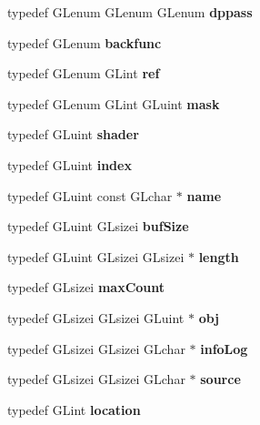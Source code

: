 \begin{DoxyCompactItemize}
\item 
typedef G\+Lenum G\+Lenum G\+Lenum {\bfseries dppass}\label{_s_d_l__opengl_8h_ac34ccc579f21686a5802750e270e8326}

\item 
typedef G\+Lenum {\bfseries backfunc}\label{_s_d_l__opengl_8h_a80bd5ace26a420c494f2b21d0421c5e2}

\item 
typedef G\+Lenum G\+Lint {\bfseries ref}\label{_s_d_l__opengl_8h_a083de4c8e32ad3d9059245f26be721de}

\item 
typedef G\+Lenum G\+Lint G\+Luint {\bfseries mask}\label{_s_d_l__opengl_8h_a5612bf87afe1aa200ad412866de45c1f}

\item 
typedef G\+Luint {\bfseries shader}\label{_s_d_l__opengl_8h_a57b2a96adb1d51204909a82d861e395e}

\item 
typedef G\+Luint {\bfseries index}\label{_s_d_l__opengl_8h_a57f14e05b1900f16a2da82ade47d0c6d}

\item 
typedef G\+Luint const G\+Lchar $\ast$ {\bfseries name}\label{_s_d_l__opengl_8h_af7477b8725fcf509c9623f64b9d09164}

\item 
typedef G\+Luint G\+Lsizei {\bfseries buf\+Size}\label{_s_d_l__opengl_8h_a09918d77dec487a91825343c8cfb2b2d}

\item 
typedef G\+Luint G\+Lsizei G\+Lsizei $\ast$ {\bfseries length}\label{_s_d_l__opengl_8h_a78c5c8710130a1a634d6a81d52be8db8}

\item 
typedef G\+Lsizei {\bfseries max\+Count}\label{_s_d_l__opengl_8h_a76b486a23d5da07752f89495cdaedcf4}

\item 
typedef G\+Lsizei G\+Lsizei G\+Luint $\ast$ {\bfseries obj}\label{_s_d_l__opengl_8h_a0c0d4701a6c89f4f7f0640715d27ab26}

\item 
typedef G\+Lsizei G\+Lsizei G\+Lchar $\ast$ {\bfseries info\+Log}\label{_s_d_l__opengl_8h_a66ecd5782c3b54799e8ac9edad536e74}

\item 
typedef G\+Lsizei G\+Lsizei G\+Lchar $\ast$ {\bfseries source}\label{_s_d_l__opengl_8h_afdd0f0e67e302eefcb4f6b23732e7ea3}

\item 
typedef G\+Lint {\bfseries location}\label{_s_d_l__opengl_8h_a6f0165ed903f22b8bb600c3e0b628e73}


\end{DoxyCompactItemize}
